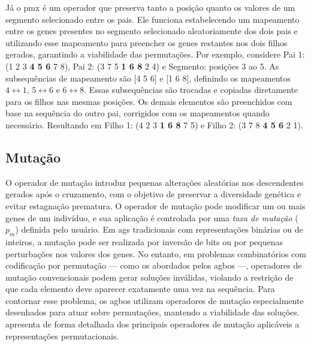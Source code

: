 
Já o \gls{pmx} é um operador que preserva tanto a posição quanto os valores de um segmento selecionado entre os pais. Ele funciona estabelecendo um mapeamento entre os genes presentes no segmento selecionado aleatoriamente dos dois pais e utilizando esse mapeamento para preencher os genes restantes nos dois filhos gerados, garantindo a viabilidade das permutações. Por exemplo, considere Pai 1: (1 2 3 \textbf{4 5 6} 7 8), Pai 2: (3 7 5 \textbf{1 6 8} 2 4) e
Segmento: posições 3 ao 5. As subsequências de mapeamento são [4 5 6] e [1 6 8], definindo os mapeamentos $4\leftrightarrow1$, $5\leftrightarrow6$ e $6\leftrightarrow8$. Essas subsequências são trocadas e copiadas diretamente para os filhos nas mesmas posições. Os demais elementos são preenchidos com base na sequência do outro pai, corrigidos com os mapeamentos quando necessário. Resultando em Filho 1: (4 2 3 \textbf{1 6 8} 7 5) e Filho 2: (3 7 8 \textbf{4 5 6} 2 1).

\subsection{Mutação}

O operador de mutação introduz pequenas alterações aleatórias nos descendentes gerados após o cruzamento, com o objetivo de preservar a diversidade genética e evitar estagnação prematura. O operador de mutação pode modificar um ou mais genes de um indivíduo, e sua aplicação é controlada por uma \textit{taxa de mutação}  ($p_m$) definida pelo usuário. Em \glspl{ag} tradicionais com representações binárias ou de inteiros, a mutação pode ser realizada por inversão de bits ou por pequenas perturbações nos valores dos genes. No entanto, em problemas combinatórios com codificação por permutação — como os abordados pelos \glspl{agbo} —, operadores de mutação convencionais podem gerar soluções inválidas, violando a restrição de que cada elemento deve aparecer exatamente uma vez na sequência. Para contornar esse problema, os \glspl{agbo} utilizam operadores de mutação especialmente desenhados para atuar sobre permutações, mantendo a viabilidade das soluções.  apresenta de forma detalhada dos principais operadores de mutação aplicáveis a representações permutacionais.


